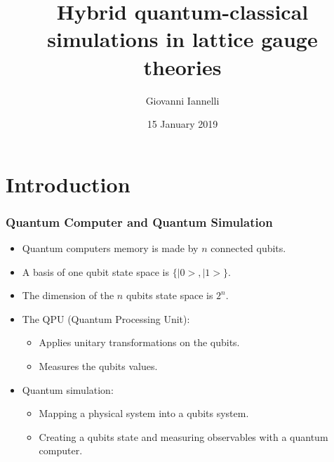 \documentclass[10pt,t,xcolor=dvipsnames,aspectratio=169]{beamer}
\title[Fellow project presentation]{Hybrid quantum-classical simulations in lattice gauge theories}
\author{Giovanni Iannelli}
\institute{Humboldt University of Berlin}
\date{15 January 2019}
\newlength\leftsidebar
\begin{document}
\leftsidebar
{
\begin{frame}[plain,t]
\titlepage
\end{frame}
}
\hoffset=0in %


\section{Introduction}


\begin{frame}
    \frametitle{Quantum Computer and Quantum Simulation}
    \begin{itemize}
        \item
            Quantum computers memory is made by $n$ connected qubits.
        \item
            A basis of one qubit state space is $\{|0>,|1>\}$.
        \item
            The dimension of the $n$ qubits state space is $2^n$.
        \item
            The QPU (Quantum Processing Unit):
            \begin{itemize}
                \item Applies unitary transformations on the qubits.
                \item Measures the qubits values.
            \end{itemize}
        \item
            Quantum simulation:
            \begin{itemize}
                \item
                    Mapping a physical system into a qubits system.
                \item
                    Creating a qubits state and measuring observables with a quantum computer.
            \end{itemize}
    \end{itemize}
\end{frame}
\end{document}
